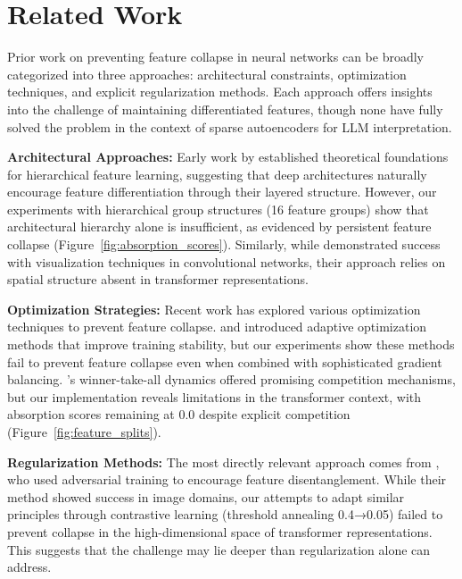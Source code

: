 \documentclass{article} %
\begin{document}
\section{Related Work}
\label{sec:related}
Prior work on preventing feature collapse in neural networks can be broadly categorized into three approaches: architectural constraints, optimization techniques, and explicit regularization methods. Each approach offers insights into the challenge of maintaining differentiated features, though none have fully solved the problem in the context of sparse autoencoders for LLM interpretation.

\textbf{Architectural Approaches:} Early work by \cite{Bengio2007LearningDA} established theoretical foundations for hierarchical feature learning, suggesting that deep architectures naturally encourage feature differentiation through their layered structure. However, our experiments with hierarchical group structures (16 feature groups) show that architectural hierarchy alone is insufficient, as evidenced by persistent feature collapse (Figure~\ref{fig:absorption_scores}). Similarly, while \cite{Zeiler2013VisualizingAU} demonstrated success with visualization techniques in convolutional networks, their approach relies on spatial structure absent in transformer representations.

\textbf{Optimization Strategies:} Recent work has explored various optimization techniques to prevent feature collapse. \cite{kingma2014adam} and \cite{loshchilov2017adamw} introduced adaptive optimization methods that improve training stability, but our experiments show these methods fail to prevent feature collapse even when combined with sophisticated gradient balancing. \cite{Maass2000OnTC}'s winner-take-all dynamics offered promising competition mechanisms, but our implementation reveals limitations in the transformer context, with absorption scores remaining at 0.0 despite explicit competition (Figure~\ref{fig:feature_splits}).

\textbf{Regularization Methods:} The most directly relevant approach comes from \cite{Mathieu2016DisentanglingFO}, who used adversarial training to encourage feature disentanglement. While their method showed success in image domains, our attempts to adapt similar principles through contrastive learning (threshold annealing 0.4→0.05) failed to prevent collapse in the high-dimensional space of transformer representations. This suggests that the challenge may lie deeper than regularization alone can address.
\end{document}
